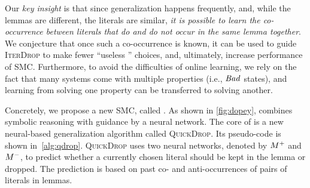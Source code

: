 Our \emph{key insight} is that since generalization happens
frequently, and, while the lemmas are different, the literals are similar, \emph{it is
possible to learn the co-occurrence between literals that do and do not occur in
the same lemma together}. We conjecture that once such a co-occurrence 
is known, it can be used to guide \textsc{IterDrop} to make
fewer ``useless '' choices, and, ultimately, increase performance of SMC.
Furthermore, to avoid the difficulties of online learning, we rely on the fact
that many systems come with multiple properties (i.e., $\mathit{Bad}$ states), and
learning from solving one property can be transferred to solving another.




Concretely, we propose a new SMC, called \dpy. As shown in
\cref{fig:dopey}, \dpy combines symbolic reasoning with guidance by a
neural network. The core of \dpy is a new neural-based generalization
algorithm called \textsc{QuickDrop}. Its pseudo-code is shown
in~\cref{alg:qdrop}. \textsc{QuickDrop} uses two neural networks, denoted by
$M^+$ and $M^-$, to predict whether a currently
chosen literal should be kept in the lemma or dropped. The prediction is based on past co- and anti-occurrences of pairs of  literals in lemmas. 


